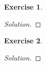 \documentclass[12pt,a4]{article}
\theoremstyle{definition}
\newtheorem{exercise}{Exercise}
\begin{document}
\begin{exercise}
	
\end{exercise}
\begin{proof}[Solution]
	
\end{proof}

\begin{exercise}
	
\end{exercise}
\begin{proof}[Solution]
	
\end{proof}
\end{document}
